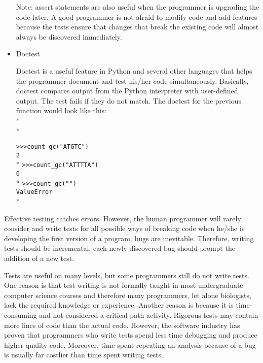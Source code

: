 \documentclass[ChapterTOCs,krantz2]{krantz} %
\begin{document}
\begin{itemize}
Note: assert
statements are also useful 
when the programmer is upgrading the code later.
A good programmer is not afraid to modify code and add features because the
tests ensure that changes that break the existing code will almost always
be discovered immediately.

\item Doctest

Doctest is a useful feature in Python and several other languages that helps the 
programmer document
and test his/her code simultaneously. Basically, doctest compares output
from the Python interpreter with user-defined output. The test fails if they do
not match. The doctest for the previous function would look like this:\\*\\*

\texttt{>>>count\_gc("ATGTC") \\2}\\*
\texttt{>>>count\_gc("ATTTTA") \\0}\\*
\texttt{>>>count\_gc("")\\ValueError}\\*

\end{itemize}

Effective testing catches errors. However, the human programmer will
rarely consider and write tests for all possible ways of breaking code when
he/she is developing the first version of a program; bugs are inevitable.
Therefore, writing tests should be incremental; each newly discovered bug
should prompt the addition of a new test.

Tests are useful on many levels, but some programmers still do not
write tests.  One reason is that test writing is not formally taught in most
undergraduate computer science courses and therefore many programmers, let
alone biologists, lack the required knowledge or experience.  Another reason is
because it is time-consuming and not considered a critical path activity.
Rigorous tests may contain more lines of code than the actual code. 
However, the software industry has proven that 
programmers who write tests 
spend less time debugging and produce higher quality code.
Moreover, time spent repeating an analysis because of a bug is usually far
costlier than time spent writing tests.
\end{document}
